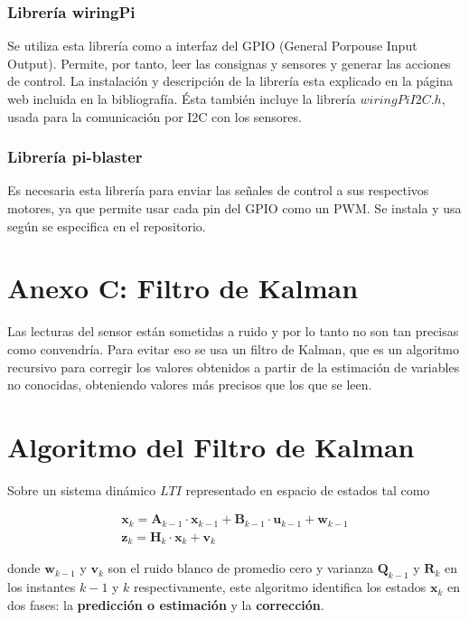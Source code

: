 \documentclass[twoside,11pt]{book}
\begin{document}
\subsubsection*{Librería wiringPi}
Se utiliza esta librería \cite{wiringPi} como a interfaz del GPIO (General Porpouse Input Output). Permite, por tanto, leer las consignas y sensores y generar las acciones de control. 
La instalación y descripción de la librería esta explicado en la página web incluida en la bibliografía. Ésta también incluye la librería $wiringPiI2C.h$, usada para la comunicación por I2C con los sensores.

\subsubsection*{Librería pi-blaster}
Es necesaria esta librería \cite{pi-blaster} para enviar las señales de control a sus respectivos motores, ya que permite usar cada pin del GPIO como un PWM. Se instala y usa según se especifica en el repositorio.

\newpage
\section*{Anexo C: Filtro de Kalman}

Las lecturas del sensor están sometidas a ruido y por lo tanto no son tan precisas como convendría. Para evitar eso se usa un filtro de Kalman,  que es un algoritmo recursivo para corregir los valores obtenidos a partir de la estimación de variables no conocidas, obteniendo valores más precisos que los que se leen. 

\section*{Algoritmo del Filtro de Kalman}

Sobre un sistema dinámico $LTI$ representado en espacio de estados tal como

\begin{equation}
\begin{array}{l}
\mathbf{x}_{k}=\mathbf{A}_{k-1} \cdot \mathbf{x}_{k-1} + \mathbf{B}_{k-1} \cdot \mathbf{u}_{k-1} + \mathbf{w}_{k-1} \\
\mathbf{z}_{k}=\mathbf{H}_{k} \cdot \mathbf{x}_{k} + \mathbf{v}_{k}
\end{array}
\end{equation}		

donde $\mathbf{w}_{k-1}$ y $\mathbf{v}_{k}$ son el ruido blanco de promedio cero y varianza $\mathbf{Q}_{k-1}$ y $\mathbf{R}_{k}$ en los instantes $k-1$ y $k$ respectivamente, este algoritmo identifica los estados $\mathbf{x}_{k}$ en dos fases: la \textbf{predicción o estimación} y la \textbf{corrección}.  \\
\end{document}
